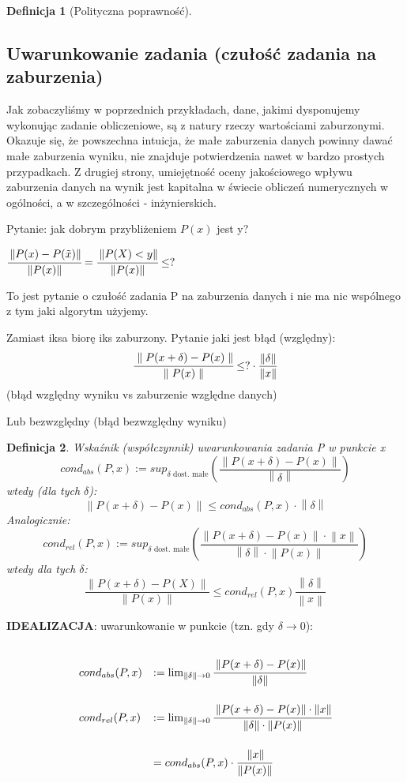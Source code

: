 \documentclass[hidelinks,a4paper,fleqn]{article}
\newcommand{\ra}{\rightarrow}
\newcommand{\norm}[1]{\left\lVert#1\right\rVert}
\newtheorem{defi}{Definicja}
\begin{document}
\begin{defi}[Polityczna poprawność]\end{defi}

\subsection{Uwarunkowanie zadania (czułość zadania na zaburzenia)}
Jak zobaczyliśmy w poprzednich przykładach, dane, jakimi dysponujemy wykonując zadanie obliczeniowe, są z natury rzeczy wartościami zaburzonymi. Okazuje się, że powszechna intuicja, że małe zaburzenia danych powinny dawać małe zaburzenia wyniku, nie znajduje potwierdzenia nawet w bardzo prostych przypadkach. Z drugiej strony, umiejętność oceny jakościowego wpływu zaburzenia danych na wynik jest kapitalna w świecie obliczeń numerycznych w ogólności, a w szczególności - inżynierskich.

Pytanie: jak dobrym przybliżeniem $P(x)$ jest y? 

$\cfrac{\norm{P(x) - P(\tilde{x})}}{\norm{P(x)}} = \cfrac{\norm{P(X) < y}}{\norm{P(x)}} \leq ?$

To jest pytanie o czułość zadania P na zaburzenia danych i nie ma nic wspólnego z tym jaki algorytm użyjemy.


Zamiast iksa biorę iks zaburzony. Pytanie jaki jest błąd (względny):
\[
	\cfrac{\parallel P(x + \delta) - P(x) \parallel}{\parallel P(x) \parallel} \leq ? \cdot \frac{\norm{\delta}}{\norm{x}}
\]
(błąd względny wyniku vs zaburzenie względne danych)

Lub bezwzględny (błąd bezwzględny wyniku)


\begin{defi}
	Wskaźnik (współczynnik) uwarunkowania zadania P w punkcie x
	\[
		cond_{abs}(P, x) := sup_{\delta\textrm{ dost. małe}}\left(\frac{\norm{P(x + \delta) - P(x)}}{\norm{\delta}}\right)
	\]
	wtedy (dla tych $\delta$):
	\[
		\norm{P(x + \delta) - P(x)} \leq cond_{abs} (P, x) \cdot \norm{\delta}
	\]
	Analogicznie:
	\[
		cond_{rel}(P, x) := sup_{\delta\textrm{ dost. małe}}\left(\frac{\norm{P(x + \delta) - P(x)} \cdot \norm{x}}{\norm{\delta} \cdot \norm{P(x)}}\right)
	\]
	wtedy dla tych $\delta$:
	\[
		\frac{\norm{P(x + \delta) - P(X)}}{\norm{P(x)}} \leq cond_{rel} (P, x) \frac{\norm{\delta}}{\norm{x}}
	\]
	
\end{defi}

\textbf{IDEALIZACJA}: uwarunkowanie w punkcie (tzn. gdy $\delta \ra 0$):

\[\def\arraystretch{3.4}
	\begin{array}{ll}
		cond_{abs}(P, x) & := \lim_{\norm{\delta} \ra 0} \cfrac{\norm{P(x + \delta) - P(x)}}{\norm{\delta}} \\
		cond_{rel}(P, x) & := \lim_{\norm{\delta} \ra 0} \cfrac{\norm{P(x + \delta) - P(x)} \cdot \norm{x}}{\norm{\delta} \cdot \norm{P(x)}} \\ & = cond_{abs} (P, x) \cdot \cfrac{\norm{x}}{\norm{P(x)}}
	\end{array}
\]
\end{document}
